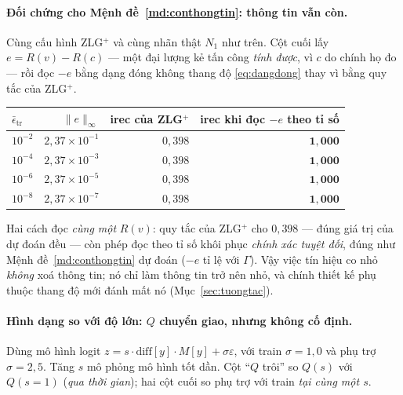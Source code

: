 \documentclass[11pt]{article}
\theoremstyle{remark}
\begin{document}
\paragraph{Đối chứng cho Mệnh đề~\ref{md:conthongtin}: thông tin vẫn còn.}
Cùng cấu hình ZLG$^+$ và cùng nhãn thật $N_1$ như trên.
Cột cuối lấy $e = R(v)-R(c)$ --- một đại lượng kẻ tấn công \emph{tính được},
vì $c$ do chính họ đo --- rồi đọc $-e$ bằng dạng đóng không thang độ
\eqref{eq:dangdong} thay vì bằng quy tắc của ZLG$^+$.

\begin{center}
\footnotesize
\begin{tabular}{@{}lrrr@{}}
\toprule
$\bar\epsilon_{\mathrm{tr}}$ & $\|e\|_\infty$ & irec của ZLG$^+$
 & irec khi đọc $-e$ theo tỉ số \\
\midrule
$10^{-2}$ & $2{,}37\times10^{-1}$ & $0{,}398$ & $\mathbf{1{,}000}$ \\
$10^{-4}$ & $2{,}37\times10^{-3}$ & $0{,}398$ & $\mathbf{1{,}000}$ \\
$10^{-6}$ & $2{,}37\times10^{-5}$ & $0{,}398$ & $\mathbf{1{,}000}$ \\
$10^{-8}$ & $2{,}37\times10^{-7}$ & $0{,}398$ & $\mathbf{1{,}000}$ \\
\bottomrule
\end{tabular}
\end{center}

Hai cách đọc \emph{cùng một} $R(v)$: quy tắc của ZLG$^+$ cho $0{,}398$ ---
đúng giá trị của dự đoán đều --- còn phép đọc theo tỉ số khôi phục
\emph{chính xác tuyệt đối}, đúng như Mệnh đề~\ref{md:conthongtin} dự đoán
($-e$ tỉ lệ với $\Gamma$). Vậy việc tín hiệu co nhỏ \emph{không} xoá thông
tin; nó chỉ làm thông tin trở nên nhỏ, và chính thiết kế phụ thuộc thang độ
mới đánh mất nó (Mục~\ref{sec:tuongtac}).

\paragraph{Hình dạng so với độ lớn: $Q$ chuyển giao, nhưng không cố định.}
Dùng mô hình logit $z = s\cdot\mathrm{diff}[y]\cdot M[y] + \sigma\varepsilon$,
với train $\sigma=1{,}0$ và phụ trợ $\sigma=2{,}5$. Tăng $s$ mô phỏng mô hình
tốt dần. Cột ``$Q$ trôi'' so $Q(s)$ với $Q(s{=}1)$ (\emph{qua thời gian});
hai cột cuối so phụ trợ với train \emph{tại cùng một $s$}.
\end{document}
